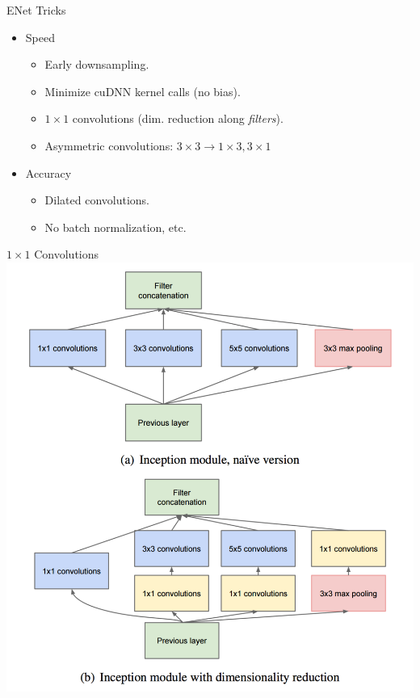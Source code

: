 \documentclass[]{beamer}
\begin{document}
\begin{frame}{ENet Tricks}
\begin{itemize}
\item Speed 
  \begin{itemize}
  \item Early downsampling.
  \item Minimize cuDNN kernel calls (no bias).
  \item $1 \times 1$ convolutions (dim. reduction along \emph{filters}).
  \item Asymmetric convolutions: $3 \times 3 \to 1 \times 3, 3 \times 1$
  \end{itemize}
\item Accuracy
  \begin{itemize}
  \item Dilated convolutions.
  \item No batch normalization, etc.
  \end{itemize}
\end{itemize}
\end{frame}

\begin{frame}{$1 \times 1$ Convolutions}
\centering
\includegraphics[scale=0.375]{figures/1x1-convolutions}
\end{frame}
\end{document}
